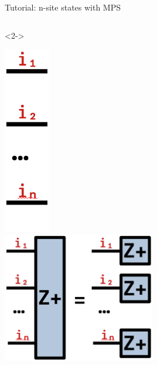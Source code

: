 \begin{frame}[fragile]{Tutorial: n-site states with MPS}
\begin{columns}
\begin{column}{5.5cm}
\begin{onlyenv}<2->
\vspace*{0.0cm}
\begin{center}
\includegraphics[width=0.15\textwidth]{
  slides/assets/in.png
} \\
\includegraphics[width=0.5\textwidth]{
  slides/assets/Zpn.png
}
\end{center}
\vspace*{0.0cm}
\end{onlyenv}

\end{column}

\end{columns}

\end{frame}
